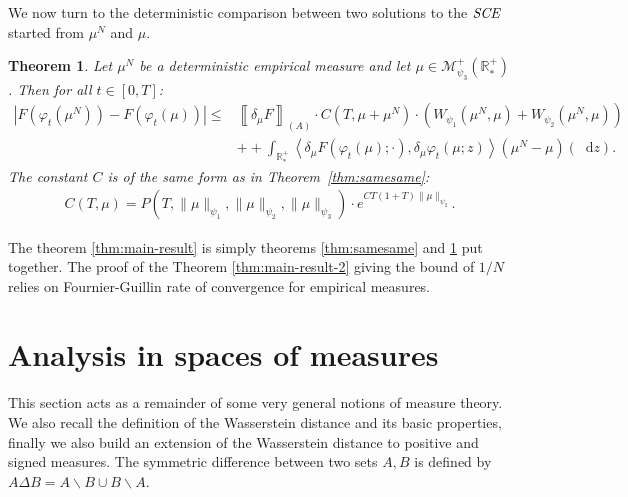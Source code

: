 \documentclass[11pt,a4paper]{article}
\newcommand{\RRP}{\mathbb{R}^+_*}
\newcommand{\MC}{\mathcal{M}}
\newcommand{\SCE}{\emph{SCE}}
\newcommand{\A}{(A)}
\newcommand{\dd}{\mathop{}\!\mathrm{d}}
\newtheorem{theorem}{Theorem}[section]
\begin{document}
\medskip

We now turn to the deterministic comparison between two solutions to the $\SCE$ started from $\mu^N$ and $\mu$.

\begin{theorem}\label{thm:difdif}
    Let $\mu^N$ be a deterministic empirical measure and let $\mu \in \MC^+_{\psi_3}(\RRP)$. Then for all $t \in [0,T]$:
    \begin{align*}
        \left| F\left(\varphi_t(\mu^N)\right) - F\left(\varphi_t(\mu)\right) \right|
        \leq& \left\llbracket \delta_\mu F \right\rrbracket_{\A} \cdot C(T,\mu + \mu^N) \cdot \left(W_{\psi_1}(\mu^N,\mu) + W_{\psi_2}(\mu^N,\mu)\right) \\
        &+ + \int_{\RRP} \left\langle \delta_\mu F\left(\varphi_t \left(\mu\right);\cdot \right), \delta_\mu \varphi_t\left(\mu;z \right) \right\rangle \left(\mu^N - \mu\right)(\dd z).
    \end{align*}
    The constant $C$ is of the same form as in Theorem~\ref{thm:samesame}:
    \begin{align*}
        C(T,\mu) = P\left(T,\|\mu\|_{\psi_1},\|\mu\|_{\psi_2},\|\mu\|_{\psi_3}\right) 
        \cdot e^{CT(1 + T)\|\mu\|_{\psi_2}}.
    \end{align*}
\end{theorem}
The theorem \ref{thm:main-result} is simply theorems \ref{thm:samesame} and \ref{thm:difdif} put together. The proof of the Theorem \ref{thm:main-result-2} giving the bound of $1/N$ relies on Fournier-Guillin rate of convergence for empirical measures.

\section{Analysis in spaces of measures}\label{section:analysis-measures}
This section acts as a remainder of some very general notions of measure theory. We also recall the definition of the Wasserstein distance and its basic properties, finally we also build an extension of the Wasserstein distance to positive and signed measures. The symmetric difference between two sets $A,B$ is defined by $A\Delta B = A\backslash B \cup B\backslash A$.
\end{document}
